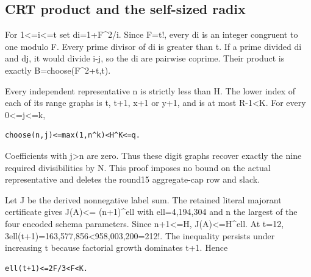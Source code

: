\subsection{CRT product and the self-sized radix}



For 1\textless{}\allowbreak{}=\allowbreak{}i\textless{}\allowbreak{}=\allowbreak{}t set di=\allowbreak{}1+\allowbreak{}F\textasciicircum{}\allowbreak{}2/\allowbreak{}i. Since F=\allowbreak{}t!, every di is an integer congruent to one modulo F. Every prime divisor of di is greater than t. If a prime divided di and dj, it would divide i-j, so the di are pairwise coprime. Their product is exactly B=\allowbreak{}choose(F\textasciicircum{}\allowbreak{}2+\allowbreak{}t,t).



Every independent representative n is strictly less than H. The lower index of each of its range graphs is t, t+\allowbreak{}1, x+\allowbreak{}1 or y+\allowbreak{}1, and is at most R-1\textless{}\allowbreak{}K. For every 0\textless{}\allowbreak{}=\allowbreak{}j\textless{}\allowbreak{}=\allowbreak{}k,



\begin{verbatim}
choose(n,j)<=max(1,n^k)<H^K<=q.
\end{verbatim}

Coefficients with j\textgreater{}\allowbreak{}n are zero. Thus these digit graphs recover exactly the nine required divisibilities by N. This proof imposes no bound on the actual representative and deletes the round15 aggregate-cap row and slack.



Let J be the derived nonnegative label sum. The retained literal majorant certificate gives J(A)\textless{}\allowbreak{}=\allowbreak{} (n+\allowbreak{}1)\textasciicircum{}\allowbreak{}ell with ell=\allowbreak{}4,194,304 and n the largest of the four encoded schema parameters. Since n+\allowbreak{}1\textless{}\allowbreak{}=\allowbreak{}H, J(A)\textless{}\allowbreak{}=\allowbreak{}H\textasciicircum{}\allowbreak{}ell. At t=\allowbreak{}12, 3ell(t+\allowbreak{}1)=\allowbreak{}163,577,856\textless{}\allowbreak{}958,003,200=\allowbreak{}2\textasteriskcentered{}\allowbreak{}12!. The inequality persists under increasing t because factorial growth dominates t+\allowbreak{}1. Hence



\begin{verbatim}
ell(t+1)<=2F/3<F<K.
\end{verbatim}

